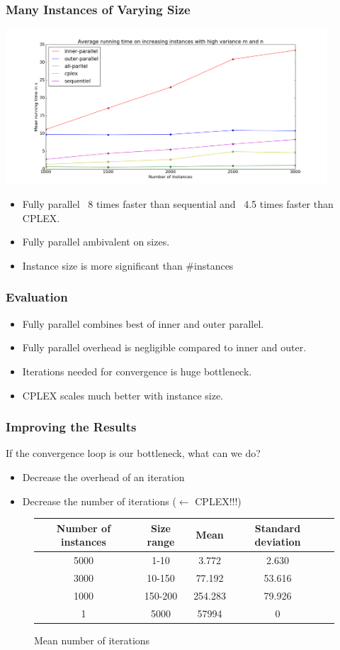 \documentclass{beamer}
\begin{document}
\begin{frame}[fragile]
\frametitle{Many Instances of Varying Size}
\centering
\includegraphics[width=0.9\textwidth]{../Doc/figures/many-varying}
\begin{itemize}
	\item Fully parallel ~8 times faster than sequential and ~4.5 times faster than CPLEX.
	\item Fully parallel ambivalent on sizes.
	\item Instance size is more significant than \#instances
\end{itemize}
\end{frame}

\begin{frame}
\frametitle{Evaluation}
\begin{itemize}
\item Fully parallel combines best of inner and outer parallel.
\pause
\item Fully parallel overhead is negligible compared to inner and outer.
\pause
\item Iterations needed for convergence is huge bottleneck.
\pause
\item CPLEX scales much better with instance size.
\end{itemize}
\end{frame}

\begin{frame}
\frametitle{Improving the Results}

If the convergence loop is our bottleneck, what can we do?

\begin{itemize}
\item Decrease the overhead of an iteration
\item Decrease the number of iterations ($\leftarrow$ CPLEX!!!)
\end{itemize}

\begin{figure}
\begin{tabular}{|c|c|c|c|c|}
\hline
\textbf{Number of instances} & \textbf{Size range} & \textbf{Mean} & \textbf{Standard deviation} \\\hline
5000 & 1-10 & 3.772 & 2.630 \\\hline
3000 & 10-150 & 77.192 & 53.616 \\\hline
1000 & 150-200 & 254.283 & 79.926 \\\hline
1 & 5000 & 57994 & 0 \\\hline
\end{tabular}
\caption{Mean number of iterations}
\end{figure}
\end{frame}
\end{document}
